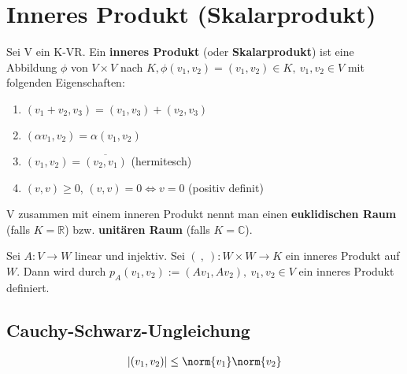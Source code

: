 \chapter{Inneres Produkt (Skalarprodukt)}
\begin{definition}
Sei V ein K-VR. Ein \textbf{inneres Produkt} (oder \textbf{Skalarprodukt}) ist eine Abbildung $\phi$ von $V \times V$ nach $K, \phi (v_1,v_2) = (v_1,v_2) \in K,~v_1,v_2 \in V$ mit folgenden Eigenschaften:
\begin{enumerate}
	\item $(v_1+v_2,v_3) = (v_1,v_3)+(v_2,v_3)$
	\item $(\alpha v_1,v_2) = \alpha (v_1,v_2)$
	\item $(v_1,v_2) = \overline{(v_2,v_1)}$ (hermitesch)
	\item $(v,v) \geq 0$, $(v,v) = 0 \Leftrightarrow v=0$ (positiv definit)
\end{enumerate}
\end{definition}
\begin{remark}
V zusammen mit einem inneren Produkt nennt man einen \textbf{euklidischen Raum} (falls $K=\mathbb{R}$) bzw. \textbf{unitären Raum} (falls $K=\mathbb{C}$).
\end{remark}

\begin{lemma}
Sei $A:V \rightarrow W$ linear und injektiv. Sei $(~,~):W \times W \rightarrow K$ ein inneres Produkt auf $W$. Dann wird durch $p_A(v_1,v_2):=(Av_1,Av_2),~v_1,v_2 \in V$ ein inneres Produkt definiert.
\end{lemma}

\section{Cauchy-Schwarz-Ungleichung}
\begin{theorem}
\begin{align*}
|(v_1,v_2)| \leq \norm{v_1} \norm{v_2}
\end{align*}
\end{theorem}

